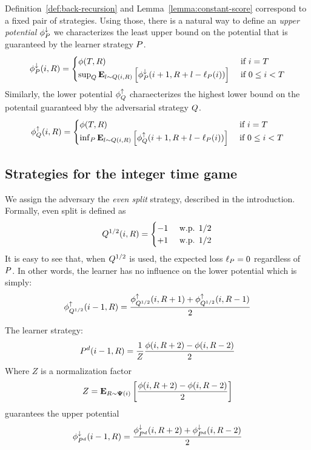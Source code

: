 \documentclass[12pt]{article} %
\begin{document}
Definition~\ref{def:back-recursion} and
Lemma~\ref{lemma:constant-score} correspond to a fixed pair of
strategies. Using those, there is a natural way to define an {\em
  upper potential} $\phi^{\downarrow}_P$ we characterizes the least upper
bound on the potential that is guaranteed by the learner strategy
$P$.
\begin{equation} \label{eqn:recursive-upper}
  \phi^{\downarrow}_P(i,R) =
  \begin{cases}
    \phi(T,R) & \mbox{ if } i=T \\
    \sup_Q {\bf E}_{l \sim Q(i,R)}\left[ \phi^{\downarrow}_P(i+1,R+l-\ell_P(i)) \right] & \mbox{ if }
    0\leq i < T
  \end{cases}
\end{equation}
 Similarly, the lower potential $\phi^{\uparrow}_Q$ charaecterizes
the highest lower bound on the potentail guaranteed bby the
adversarial strategy $Q$.
\begin{equation} \label{eqn:recursive-lower}
  \phi^{\uparrow}_Q(i,R) =
  \begin{cases}
    \phi(T,R) & \mbox{ if } i=T \\
    \inf_P {\bf E}_{l \sim Q(i,R)}\left[ \phi^{\uparrow}_Q(i+1,R+l-\ell_P(i)) \right] & \mbox{ if }
    0\leq i < T
  \end{cases}
\end{equation}

\subsection{Strategies  for the integer time game}
We assign the adversary the {\em even split} strategy, described in the
introduction. Formally, even split is defined as 
\begin{equation} \label{eqn:adv-strat}
  Q^{1/2}(i,R) =
  \begin{cases}
    -1 & \mbox{ w.p. } 1/2\\
    +1 & \mbox{ w.p. } 1/2
  \end{cases}
\end{equation}
It is easy to see that, when $Q^{1/2}$ is used, the expected loss
$\ell_P=0$ regardless of $P$. In other words, the learner has no
influence on the lower potential which is simply:
 \begin{equation} \label{eqn:value-iteration-lower}
   \phi^{\uparrow}_{Q^{1/2}}(i-1, R) = \frac{\phi^{\uparrow}_{Q^{1/2}}(i,R+1) + \phi^{\uparrow}_{Q^{1/2}}(i,R-1)}{2}
 \end{equation}
   
 The learner strategy:
 \begin{equation} \label{eqn:learner-strat-1}
   P^d(i-1,R) = \frac{1}{Z} \frac{\phi(i,R+2) - \phi(i,R-2)}{2}
 \end{equation}
 Where $Z$ is a normalization factor
 $$Z = {\bf E}_{R \sim {\bf \Psi}(i)}\left[ \frac{\phi(i,R+2) - \phi(i,R-2)}{2} \right]$$
 guarantees the upper potential 
 \begin{equation} \label{eqn:value-iteration-upper-recursion}
   \phi^{\downarrow}_{P^d}(i-1, R) = \frac{\phi^{\downarrow}_{P^d}(i,R+2) + \phi^{\downarrow}_{P^d}(i,R-2)}{2}
 \end{equation}
 
\end{document}
